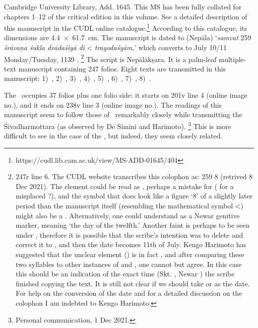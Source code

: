 Cambridge University Library, Add. 1645. This MS has been fully
collated for chapters 1--12 of the critical edition in this volume. 
See a detailed description of this manuscript in the CUDL online catalogue.\footnote{https://cudl.lib.cam.ac.uk/view/MS-ADD-01645/404}
According to this catalogue, its dimensions are 
4.4~×~61.7~cm. The manu\-script is dated to (Nepāla) `\emph{samvat} 259
\emph{śrāvaṇa śukla dvādaśiyā di} \textless{} \emph{trayodaśyām},'
which converts to July 10/11 Monday/Tuesday, 1139 \CE.%
		 \footnote{\Fol247r line 6. The CUDL website transcribes this
		  colophon as:  259 
		  \skt{śrāvaṇaśukladvādaśi{\rm[}pyaḍi} 8 
		   (retrived 8 Dec 2021). 
		  The element  could be read as
		  , perhaps a mistake for
		  \skt{di} ( for a misplaced ?), and the
		  symbol that does look like a figure `8' of a slightly later period
		  than the manuscript itself (resembling the mathematical symbol
		  \textless{}) might also be a . 
		  Alternatively, one could understand  as a Newar genitive marker,
		   meaning `the day of the twelfth.'
		  Another faint
		   is perhaps to be seen under ,
		  therefore it is possible that the scribe's intention was to delete 	
		   and correct it to , 
		  and then the date becomes 11th of July.
		  Kengo Harimoto 
		  has suggested that the unclear element
		  () is in fact , 
		  and after comparing these two syllables to other instances of
		   and , one cannot but agree. 
		  In this case this should be an indication of the
		  exact time (Skt. , Newar ) 
		  the scribe finished copying the text. It is still not clear
		  if we should take  or  
		  as the date. For help on the conversion of the date and 
		  for a detailed discussion on the colophon I am indebted
		  to Kengo Harimoto.} 
The script is Nepālā\-kṣara. It is a palm-leaf multiple-text 
manuscript containing 247 folios. Eight texts are transmitted 
in this manuscript: 
1)~\SDhS,
2)~\SDhU,
3)~\SDhSangr,
4)~\SivaUp,
5)~\Ums,
6)~\Uums, 
7)~\Vss,
8)~\DharmP.


The \VSS\ occupies 37 folios plus one folio side: it starts on \fol201v
line 4 (online image no.), 
and it ends on \fol238v line 3 (online image
no.). 
The readings of this manuscript seem to follow those of \msNa\
remarkably closely while transmitting the 
Śivadharmottara (as observed by De Simini and Harimoto).%
\footnote{Personal communication, 1 Dec 2021.} This
is more difficult to see in the case of the \VSS, 
but indeed, they seem closely related. 


